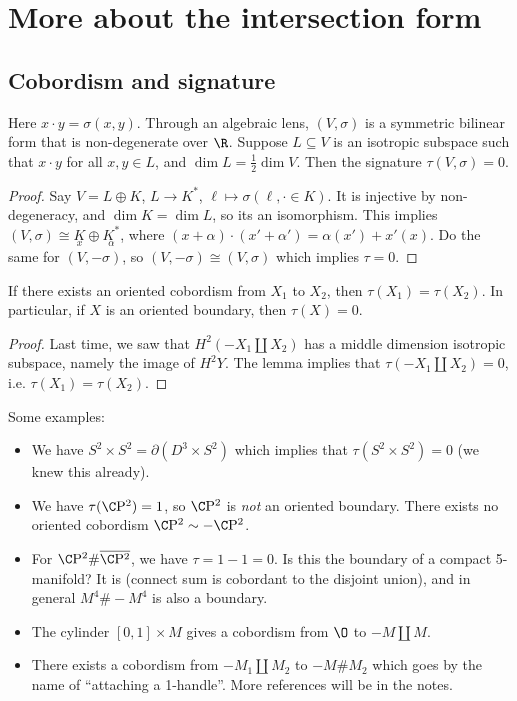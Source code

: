 \section{More about the intersection form} 
\subsection{Cobordism and signature}
Here $x\cdot  y = \sigma(x,y)$. Through an algebraic lens, $(V,\sigma)$ is a symmetric bilinear form that is non-degenerate over $\R$. Suppose $L \subseteq V$ is an isotropic subspace such that $x\cdot y$ for all $x,y \in L$, and $\dim L = \frac{1}{2}\dim V$. Then the signature $\tau(V, \sigma)=0$.
\begin{proof}
    Say $V = L \oplus K$, $L \to K^*$, $\ell \mapsto  \sigma(\ell, \cdot \in K )$. It is injective by non-degeneracy, and $\dim K = \dim L$, so its an isomorphism. This implies $(V, \sigma) \cong \underset{x}{K} \oplus \underset{\alpha }{K^*} $, where $(x+\alpha ) \cdot (x' + \alpha ') = \alpha (x') + x'(x)$. Do the same for $(V, -\sigma)$, so $(V, -\sigma) \cong  (V, \sigma) $ which implies $\tau  = 0$.
\end{proof}
\begin{theorem}
    If there exists an oriented cobordism from $X_1$ to $X_2$, then $\tau(X_1) = \tau(X_2)$. In particular, if $X$ is an oriented boundary, then $\tau(X) =0$.
\end{theorem}
\begin{proof}
    Last time, we saw that $H^2(-X_1 \amalg X_2)$ has a middle dimension isotropic subspace, namely the image of $H^2 Y$. The lemma implies that $\tau(-X_1 \amalg X_2) = 0$, i.e. $\tau(X_1)=\tau(X_2)$.
\end{proof}
\begin{example}
    Some examples:
    \begin{itemize}
    \setlength\itemsep{-.2em}
\item We have $S^2 \times S^2 = \partial (D^3 \times S^2)$ which implies that $\tau(S^2 \times S^2) = 0$ (we knew this already).
\item We have $\tau(\C \mathrm{P^2})=1$, so $\C \mathrm{P^2}$ is \emph{not} an oriented boundary. There exists no oriented cobordism $\C \mathrm{P^2}\sim - \C \mathrm{P^2}$.
\item For  $\C \mathrm{P^2}\# \overline{\C \mathrm{P^2}}$, we have $\tau=1-1=0$. Is this the boundary of a compact 5-manifold? It is (connect sum is cobordant to the disjoint union), and in general $M^4 \# -M^4$ is also a boundary.
\item The cylinder $[0,1] \times M$ gives a cobordism from $\O$ to $-M \amalg M$. 
\item There exists a cobordism from $-M_1 \amalg M_2$ to $-M \# M_2$ which goes by the name of ``attaching a 1-handle''. More references will be in the notes.
    \end{itemize}
\end{example}
